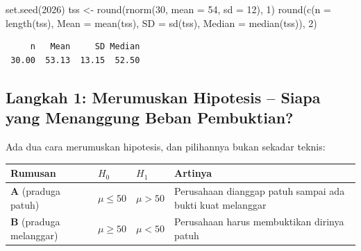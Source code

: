 \documentclass[
  indonesian,
  letterpaper,
]{book}
\newenvironment{Shaded}{\begin{snugshade}}{\end{snugshade}}
\newcommand{\AttributeTok}[1]{\textcolor[rgb]{0.40,0.45,0.13}{#1}}
\newcommand{\DecValTok}[1]{\textcolor[rgb]{0.68,0.00,0.00}{#1}}
\newcommand{\FunctionTok}[1]{\textcolor[rgb]{0.28,0.35,0.67}{#1}}
\newcommand{\NormalTok}[1]{\textcolor[rgb]{0.00,0.23,0.31}{#1}}
\newcommand{\OtherTok}[1]{\textcolor[rgb]{0.00,0.23,0.31}{#1}}
\newcounter{none} %
\begin{document}
\begin{Shaded}
\begin{Highlighting}[]
\FunctionTok{set.seed}\NormalTok{(}\DecValTok{2026}\NormalTok{)}
\NormalTok{tss }\OtherTok{\textless{}{-}} \FunctionTok{round}\NormalTok{(}\FunctionTok{rnorm}\NormalTok{(}\DecValTok{30}\NormalTok{, }\AttributeTok{mean =} \DecValTok{54}\NormalTok{, }\AttributeTok{sd =} \DecValTok{12}\NormalTok{), }\DecValTok{1}\NormalTok{)}
\FunctionTok{round}\NormalTok{(}\FunctionTok{c}\NormalTok{(}\AttributeTok{n =} \FunctionTok{length}\NormalTok{(tss), }\AttributeTok{Mean =} \FunctionTok{mean}\NormalTok{(tss), }\AttributeTok{SD =} \FunctionTok{sd}\NormalTok{(tss), }\AttributeTok{Median =} \FunctionTok{median}\NormalTok{(tss)), }\DecValTok{2}\NormalTok{)}
\end{Highlighting}
\end{Shaded}

\begin{verbatim}
     n   Mean     SD Median 
 30.00  53.13  13.15  52.50 
\end{verbatim}

\subsection{Langkah 1: Merumuskan Hipotesis -- Siapa yang Menanggung
Beban
Pembuktian?}\label{langkah-1-merumuskan-hipotesis-siapa-yang-menanggung-beban-pembuktian}

Ada dua cara merumuskan hipotesis, dan pilihannya bukan sekadar teknis:

{\def\LTcaptype{none} %
\begin{longtable}[]{@{}
  >{\raggedright\arraybackslash}p{}
  >{\centering\arraybackslash}p{}
  >{\centering\arraybackslash}p{}
  >{\raggedright\arraybackslash}p{}@{}}
\toprule\noalign{}
\begin{minipage}[b]{\linewidth}\raggedright
Rumusan
\end{minipage} & \begin{minipage}[b]{\linewidth}\centering
\(H_0\)
\end{minipage} & \begin{minipage}[b]{\linewidth}\centering
\(H_1\)
\end{minipage} & \begin{minipage}[b]{\linewidth}\raggedright
Artinya
\end{minipage} \\
\midrule\noalign{}
\endhead
\bottomrule\noalign{}
\endlastfoot
\textbf{A} (praduga patuh) & \(\mu \leq 50\) & \(\mu > 50\) & Perusahaan
dianggap patuh sampai ada bukti kuat melanggar \\
\textbf{B} (praduga melanggar) & \(\mu \geq 50\) & \(\mu < 50\) &
Perusahaan harus membuktikan dirinya patuh \\
\end{longtable}
}
\end{document}

